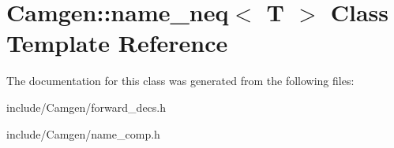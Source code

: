 \hypertarget{a00383}{}\section{Camgen\+:\+:name\+\_\+neq$<$ T $>$ Class Template Reference}
\label{a00383}


The documentation for this class was generated from the following files\+:\begin{DoxyCompactItemize}
\item 
include/\+Camgen/forward\+\_\+decs.\+h\item 
include/\+Camgen/name\+\_\+comp.\+h\end{DoxyCompactItemize}

